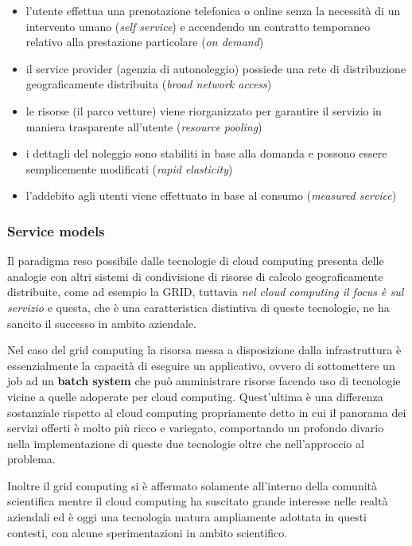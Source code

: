 \documentclass[italian,]{article}
\providecommand{\tightlist}{%
  \setlength{\itemsep}{0pt}\setlength{\parskip}{0pt}}
\begin{document}
\begin{itemize}
\tightlist
\item
  l'utente effettua una prenotazione telefonica o online senza la
  necessità di un intervento umano (\emph{self service}) e accendendo un
  contratto temporaneo relativo alla prestazione particolare (\emph{on
  demand})
\item
  il service provider (agenzia di autonoleggio) possiede una rete di
  distribuzione geograficamente distribuita (\emph{broad network
  access})
\item
  le risorse (il parco vetture) viene riorganizzato per garantire il
  servizio in maniera trasparente all'utente (\emph{resource pooling})
\item
  i dettagli del noleggio sono stabiliti in base alla domanda e possono
  essere semplicemente modificati (\emph{rapid elasticity})
\item
  l'addebito agli utenti viene effettuato in base al consumo
  (\emph{measured service})
\end{itemize}

\subsubsection{Service models}\label{service-models}

Il paradigma reso possibile dalle tecnologie di cloud computing presenta
delle analogie con altri sistemi di condivisione di risorse di calcolo
geograficamente distribuite, come ad esempio la GRID, tuttavia \emph{nel
cloud computing il focus è sul servizio} e questa, che è una
caratteristica distintiva di queste tecnologie, ne ha sancito il
successo in ambito aziendale.

Nel caso del grid computing la risorsa messa a disposizione dalla
infrastruttura è essenzialmente la capacità di eseguire un applicativo,
ovvero di sottomettere un job ad un \textbf{batch system} che può
amministrare risorse facendo uso di tecnologie vicine a quelle adoperate
per cloud computing. Quest'ultima è una differenza sostanziale rispetto
al cloud computing propriamente detto in cui il panorama dei servizi
offerti è molto più ricco e variegato, comportando un profondo divario
nella implementazione di queste due tecnologie oltre che nell'approccio
al problema.

Inoltre il grid computing si è affermato solamente all'interno della
comunità scientifica mentre il cloud computing ha suscitato grande
interesse nelle realtà aziendali ed è oggi una tecnologia matura
ampliamente adottata in questi contesti, con alcune sperimentazioni in
ambito scientifico.
\end{document}
